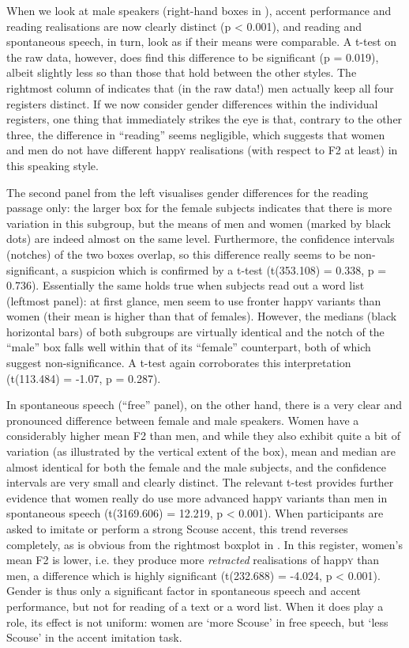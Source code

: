 When we look at male speakers (right-hand boxes in ), accent performance and reading realisations are now clearly distinct (p < 0.001), and reading and spontaneous speech, in turn, look as if their means were comparable.
A t-test on the raw data, however, does find this difference to be significant (p = 0.019), albeit slightly less so than those that hold between the other styles.
The rightmost column of  indicates that (in the raw data!) men actually keep all four registers distinct.
If we now consider gender differences within the individual registers, one thing that immediately strikes the eye is that, contrary to the other three, the difference in ``reading'' seems negligible, which suggests that women and men do not have different happ\textsc{y} realisations (with respect to F2 at least) in this speaking style.

The second panel from the left visualises gender differences for the reading passage only: the larger box for the female subjects indicates that there is more variation in this subgroup, but the means of men and women (marked by black dots) are indeed almost on the same level.
Furthermore, the confidence intervals (notches) of the two boxes overlap, so this difference really seems to be non-significant, a suspicion which is confirmed by a t-test (t(353.108) = 0.338, p = 0.736).
Essentially the same holds true when subjects read out a word list (leftmost panel): at first glance, men seem to use fronter happ\textsc{y} variants than women (their mean is higher than that of females).
However, the medians (black horizontal bars) of both subgroups are virtually identical and the notch of the ``male'' box falls well within that of its ``female'' counterpart, both of which suggest non-significance.
A t-test again corroborates this interpretation (t(113.484) = -1.07, p = 0.287).

In spontaneous speech (``free'' panel), on the other hand, there is a very clear and pronounced difference between female and male speakers.
Women have a considerably higher mean F2 than men, and while they also exhibit quite a bit of variation (as illustrated by the vertical extent of the box), mean and median are almost identical for both the female and the male subjects, and the confidence intervals are very small and clearly distinct.
The relevant t-test provides further evidence that women really do use more advanced happ\textsc{y} variants than men in spontaneous speech (t(3169.606) = 12.219, p < 0.001).
When participants are asked to imitate or perform a strong Scouse accent, this trend reverses completely, as is obvious from the rightmost boxplot in .
In this register, women's mean F2 is lower, i.e. they produce more \emph{retracted} realisations of happ\textsc{y} than men, a difference which is highly significant (t(232.688) = -4.024, p < 0.001).
Gender is thus only a significant factor in spontaneous speech and accent performance, but not for reading of a text or a word list.
When it does play a role, its effect is not uniform: women are `more Scouse' in free speech, but `less Scouse' in the accent imitation task.

